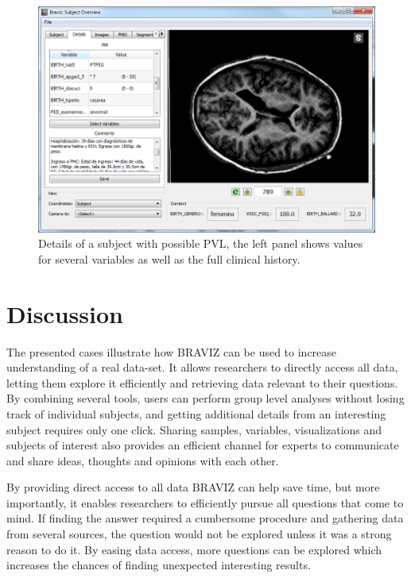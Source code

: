 \documentclass[twocolumn]{svjour3}
\begin{document}
\begin{figure}
\begin{center}
\includegraphics[width=\linewidth]{figures/cases/pvl_details}
\end{center}
 \caption{\label{fig_subject3}Details of a subject with possible PVL, the left panel shows values for several variables as well as the full clinical history.}
\end{figure}

\section{Discussion}
\label{sec:disc}

The presented cases illustrate how BRAVIZ can be used to increase understanding of a real data-set. 
It allows researchers to directly access all data, letting them explore it efficiently and retrieving data relevant to their questions. By combining several tools, users can perform group level analyses without losing track of individual subjects, and getting additional details from an interesting subject requires only one click. Sharing samples, variables, visualizations and subjects of interest also provides an efficient channel for experts to communicate and share ideas, thoughts and opinions with each other.

By providing direct access to all data BRAVIZ can help save time, but more importantly, it enables researchers to efficiently pursue all questions that come to mind. If finding the answer required a cumbersome procedure and gathering data from several sources, the question would not be explored unless it was a strong reason to do it. By easing data access, more questions can be explored which increases the chances of finding unexpected interesting results.
\end{document}
